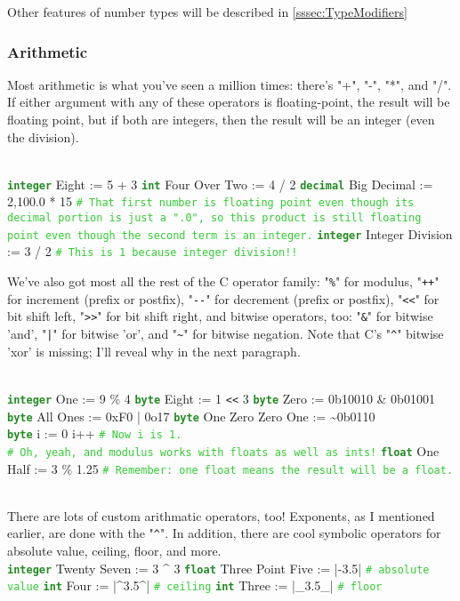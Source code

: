 \documentclass{article}
\newcommand{\sssecl}[1]{\subsubsection{#1}\label{sssec:#1}}
\newcommand{\commentline}[1]{\texttt{\textcolor{LimeGreen}{#1}}}
\newcommand{\type}[1]{\texttt{\textcolor{ForestGreen}{\textbf{#1}}}}
\newenvironment{code}[0]
{\ttfamily{}				%
\setlength\parindent{0cm}	%
~\\}
{\setlength\parindent{1cm}
~\\}
\begin{document}
\indent Other features of number types will be described in \ref{sssec:TypeModifiers}

\sssecl{Arithmetic}
\indent Most arithmetic is what you've seen a million times: there's "+", "-", "*", and "/". If either argument with any of these operators is floating-point, the result will be floating point, but if both are integers, then the result will be an integer (even the division).

\begin{code}
\type{integer} Eight := 5 + 3
\type{int} Four Over Two := 4 / 2
\type{decimal} Big Decimal := 2,100.0 * 15 \commentline{\# That first number is floating point even though its decimal portion is just a ".0", so this product is still floating point even though the second term is an integer.}
\type{integer} Integer Division := 3 / 2 \commentline{\# This is 1 because integer division!!}
\end{code}

\indent We've also got most all the rest of the C operator family: "\texttt{\%}" for modulus, "\texttt{++}" for increment (prefix or postfix), "\verb+--+" for decrement (prefix or postfix), "\verb+<<+" for bit shift left, "\verb+>>+" for bit shift right, and bitwise operators, too: "\texttt{\&}" for bitwise 'and', "\texttt{|}" for bitwise 'or', and "\texttt{\textasciitilde}" for bitwise negation. Note that C's "\texttt{\^}" bitwise 'xor' is missing; I'll reveal why in the next paragraph.

\begin{code}
\type{integer} One := 9 \% 4
\type{byte} Eight := 1 \verb+<<+ 3
\type{byte} Zero := 0b10010 \& 0b01001
\type{byte} All Ones := 0xF0 | 0o17
\type{byte} One Zero Zero One := \textasciitilde{}0b0110
\\
\type{byte} i := 0
i++	\commentline{\# Now i is 1.}
\\
\commentline{\# Oh, yeah, and modulus works with floats as well as ints!}
\type{float} One Half := 3 \% 1.25	\commentline{\# Remember: one float means the result will be a float.}
\end{code}

\indent There are lots of custom arithmatic operators, too! Exponents, as I mentioned earlier, are done with the "\texttt{\^}". In addition, there are cool symbolic operators for absolute value, ceiling, floor, and more.
\begin{code}
\type{integer} Twenty Seven := 3 \^{} 3
\type{float} Three Point Five := |-3.5|	\commentline{\# absolute value}
\type{int} Four := |\^{}3.5\^{}| \commentline{\# ceiling}
\type{int} Three := |\_3.5\_| \commentline{\# floor}
\end{code}
\end{document}
